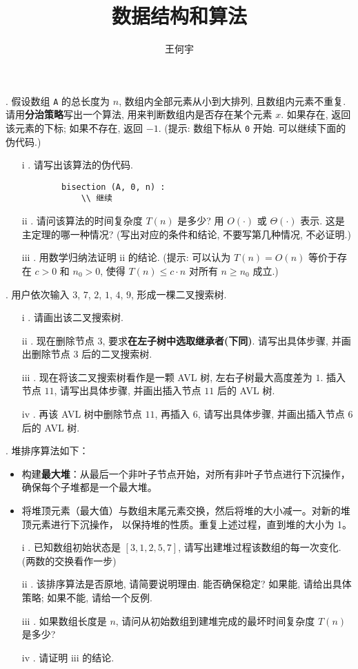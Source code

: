\documentclass[a4paper]{ctexart}
\title{数据结构和算法}
\author{王何宇}
\date{}
\theoremstyle{definition}
\theoremstyle{definition}
\begin{document}
\maketitle
\pagestyle{empty}

. 假设数组 \verb|A| 的总长度为 $n$, 数组内全部元素从小到大排列, 
且数组内元素不重复. 请用\textbf{分治策略}写出一个算法, 
用来判断数组内是否存在某个元素 $x$. 如果存在, 返回该元素的下标; 如果不存在, 返回 $-1$. 
(提示: 数组下标从 \verb|0| 开始. 可以继续下面的伪代码.)
\begin{enumerate}
    \item[i]. 请写出该算法的伪代码. 
    \begin{verbatim}
        bisection (A, 0, n) :
            \\ 继续
    \end{verbatim}
    \item[ii]. 请问该算法的时间复杂度 $T(n)$ 是多少? 用 $O(\cdot)$ 或 $\Theta(\cdot)$ 表示. 这是主定理的哪一种情况? 
    (写出对应的条件和结论, 不要写第几种情况, 不必证明.)
    \item[iii]. 用数学归纳法证明 ii 的结论. (提示: 可以认为 $T(n) = O(n)$ 等价于存在 $c > 0$ 和 $n_0 > 0$, 
    使得 $T(n) \leq c \cdot n$ 对所有 $n \geq n_0$ 成立.) 
\end{enumerate}

. 用户依次输入 $3$, $7$, $2$, $1$, $4$, $9$, 形成一棵二叉搜索树. 
\begin{enumerate}
    \item[i].  请画出该二叉搜索树.
    \item[ii].  现在删除节点 $3$, 要求\textbf{在左子树中选取继承者(下同)}. 请写出具体步骤, 
    并画出删除节点 $3$ 后的二叉搜索树. 
    \item[iii]. 现在将该二叉搜索树看作是一颗 AVL 树, 左右子树最大高度差为 $1$. 
    插入节点 $11$, 请写出具体步骤, 并画出插入节点 $11$ 后的 AVL 树.
    \item[iv]. 再该 AVL 树中删除节点 $11$, 再插入 $6$, 请写出具体步骤, 
    并画出插入节点 $6$ 后的 AVL 树. 
\end{enumerate}

. 堆排序算法如下：
\begin{itemize}
    \item 构建\textbf{最大堆}：从最后一个非叶子节点开始，对所有非叶子节点进行下沉操作，确保每个子堆都是一个最大堆。
    \item 将堆顶元素（最大值）与数组末尾元素交换，然后将堆的大小减一。对新的堆顶元素进行下沉操作，
    以保持堆的性质。重复上述过程，直到堆的大小为 1。
\end{itemize}
\begin{enumerate}
    \item[i]. 已知数组初始状态是 $[3, 1, 2, 5, 7]$, 请写出建堆过程该数组的每一次变化. 
    (两数的交换看作一步)
    \item[ii]. 该排序算法是否原地, 请简要说明理由. 能否确保稳定? 如果能, 请给出具体策略; 
    如果不能, 请给一个反例.  
    \item[iii]. 如果数组长度是 $n$, 请问从初始数组到建堆完成的最坏时间复杂度 $T(n)$ 
    是多少? 
    \item[iv]. 请证明 iii 的结论.
\end{enumerate}
\end{document}
